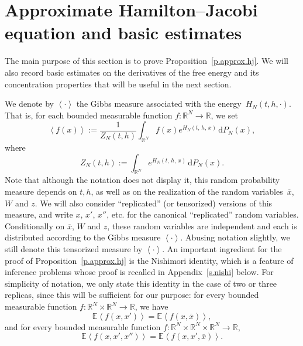 \documentclass[AHL,Unicode,longabstracts,published]{cedram}
\newcommand{\R}{\mathbb{R}}
\newcommand{\E}{\mathbb{E}}
\renewcommand{\d}{\mathrm{d}}
\newcommand{\1}{\mathds{1}}
\newcommand{\la}{\left\langle}
\newcommand{\ra}{\right\rangle}
\renewcommand{\bar}{\overline}
\begin{document}
\section{Approximate Hamilton--Jacobi equation and basic estimates}\label{s.approx.hj}
The main purpose of this section is to prove Proposition~\ref{p.approx.hj}. We will also record basic estimates on the derivatives of the free energy and its concentration properties that will be useful in the next section.



We denote by $\la \cdot \ra$ the Gibbs measure associated with the energy~$H_N(t,{h},\cdot)$. That is, for each bounded measurable function $f : \R^N \to \R$, we set
\begin{equation}\label{e.def.Gibbs}
\la f(x) \ra := \frac{1}{Z_N(t,{h})} \int_{\R^N} f(x) e^{H_N(t,\,{h},\,x)} \, \d P_N(x),
\end{equation}
where
\[
Z_N(t,{h}) := \int_{\R^N} e^{H_N(t,\,{h},\,x)} \, \d P_N(x).
\]
Note that although the notation does not display it, this random probability measure depends on $t, {h}$, as well as on the realization of the random variables~$\bar x$, $W$ and $z$. We will also consider ``replicated'' (or tensorized) versions of this measure, and write $x$, $x'$, $x''$, etc. for the canonical ``replicated'' random variables. Conditionally on $\bar x$, $W$ and $z$, these random variables are independent and each is distributed according to the Gibbs measure $\la \cdot \ra$. Abusing notation slightly, we still denote this tensorized measure by $\la \cdot \ra$. An important ingredient for the proof of Proposition~\ref{p.approx.hj} is the Nishimori identity, which is a feature of inference problems whose proof is recalled in Appendix~\ref{s.nishi} below. For simplicity of notation, we only state this identity in the case of two or three replicas, since this will be sufficient for our purpose: for every bounded measurable function $f: \R^N \times \R^N \to \R$, we have
\begin{equation}\label{e.nishi}
\E \la f(x,x') \ra = \E \la f(x,\bar x) \ra,
\end{equation}
and for every bounded measurable function $f : \R^N \times \R^N \times \R^N \to \R$,
\begin{equation}\label{e.nishi2}
\E \la f(x,x',x'') \ra = \E \la f(x,x',\bar x)\ra.
\end{equation}

\goodbreak
\end{document}
